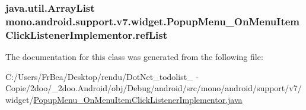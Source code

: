 \hypertarget{classmono_1_1android_1_1support_1_1v7_1_1widget_1_1_popup_menu___on_menu_item_click_listener_implementor_1fed170d302a3246c7e218aafb89d9d8}{
\subsubsection[{refList}]{\setlength{\rightskip}{0pt plus 5cm}java.util.ArrayList {\bf mono.android.support.v7.widget.PopupMenu\_\-OnMenuItemClickListenerImplementor.refList}}}
\label{classmono_1_1android_1_1support_1_1v7_1_1widget_1_1_popup_menu___on_menu_item_click_listener_implementor_1fed170d302a3246c7e218aafb89d9d8}




The documentation for this class was generated from the following file:\begin{CompactItemize}
\item 
C:/Users/FrBea/Desktop/rendu/DotNet\_\-todolist\_ - Copie/2doo/\_\-2doo.Android/obj/Debug/android/src/mono/android/support/v7/widget/\hyperlink{_popup_menu___on_menu_item_click_listener_implementor_8java}{PopupMenu\_\-OnMenuItemClickListenerImplementor.java}\end{CompactItemize}
